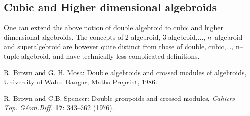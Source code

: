 \documentclass[12pt]{article}
\theoremstyle{plain}
\theoremstyle{definition}
\numberwithin{equation}{section}
\newcommand{\<}{{\langle}}
\begin{document}
\subsection{Cubic and Higher dimensional algebroids}

One can extend the above notion of double algebroid to cubic and higher dimensional algebroids.
The concepts of 2-algebroid, 3-algebroid,..., $n$--algebroid and superalgebroid are however
quite distinct from those of double, cubic,..., n--tuple algebroid, and have technically less complicated
definitions. 


\begin{thebibliography}{9}

R. Brown and G. H. Mosa: Double algebroids and crossed modules of algebroids, University of Wales--Bangor, Maths Preprint, 1986.


R. Brown and C.B. Spencer: Double groupoids and crossed modules, \emph{Cahiers Top. G\'eom.Diff.} \textbf{17}: 343--362 (1976).

\end{thebibliography}
\end{document}
